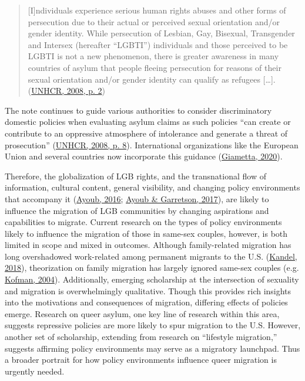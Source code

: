 \documentclass[
  11pt,
]{article}
\begin{document}
\begin{quote}
{[}I{]}ndividuals experience serious human rights abuses and other forms of persecution due to their actual or perceived sexual orientation and/or gender identity. While persecution of Lesbian, Gay, Bisexual, Transgender and Intersex (hereafter ``LGBTI'') individuals and those perceived to be LGBTI is not a new phenomenon, there is greater awareness in many countries of asylum that people fleeing persecution for reasons of their sexual orientation and/or gender identity can qualify as refugees {[}\ldots{]}. (\protect\hyperlink{ref-unhcr_2008}{UNHCR, 2008, p. 2})
\end{quote}

The note continues to guide various authorities to consider discriminatory domestic policies when evaluating asylum claims as such policies ``can create or contribute to an oppressive atmosphere of intolerance and generate a threat of prosecution'' (\protect\hyperlink{ref-unhcr_2008}{UNHCR, 2008, p. 8}). International organizations like the European Union and several countries now incorporate this guidance (\protect\hyperlink{ref-giametta_2020}{Giametta, 2020}).

Therefore, the globalization of LGB rights, and the transnational flow of information, cultural content, general visibility, and changing policy environments that accompany it (\protect\hyperlink{ref-ayoub_2016}{Ayoub, 2016}; \protect\hyperlink{ref-ayoub_2017}{Ayoub \& Garretson, 2017}), are likely to influence the migration of LGB communities by changing aspirations and capabilities to migrate. Current research on the types of policy environments likely to influence the migration of those in same-sex couples, however, is both limited in scope and mixed in outcomes. Although family-related migration has long overshadowed work-related among permanent migrants to the U.S. (\protect\hyperlink{ref-kandel_2018_familybased}{Kandel, 2018}), theorization on family migration has largely ignored same-sex couples (e.g. \protect\hyperlink{ref-kofman_2004_family}{Kofman, 2004}). Additionally, emerging scholarship at the intersection of sexuality and migration is overwhelmingly qualitative. Though this provides rich insights into the motivations and consequences of migration, differing effects of policies emerge. Research on queer asylum, one key line of research within this area, suggests repressive policies are more likely to spur migration to the U.S. However, another set of scholarship, extending from research on ``lifestyle migration,'' suggests affirming policy environments may serve as a migratory launchpad. Thus a broader portrait for how policy environments influence queer migration is urgently needed.
\end{document}
